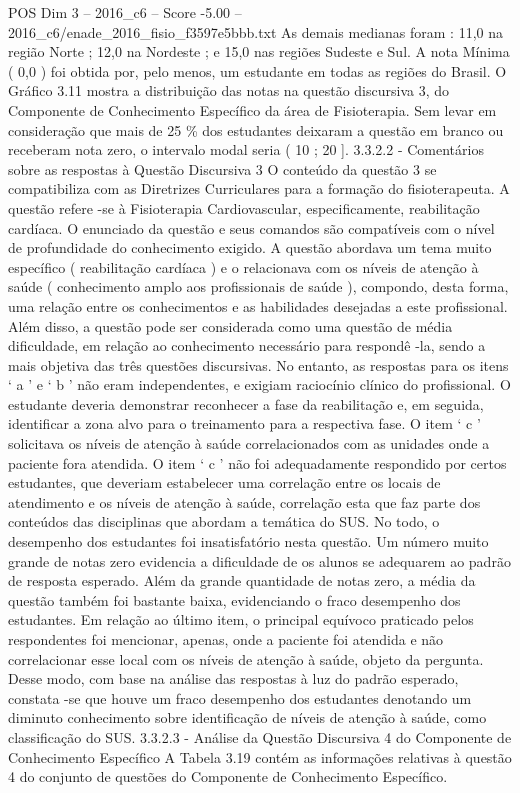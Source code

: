 \begin{textsample}{POS Dim 3 – 2016\_c6 – Score -5.00 – 2016\_c6/enade\_2016\_fisio\_f3597e5bbb.txt}
As demais medianas foram : 11,0 na região Norte ; 12,0 na Nordeste ; e 15,0 nas regiões Sudeste e Sul.
A nota Mínima ( 0,0 ) foi obtida por, pelo menos, um estudante em todas as regiões do Brasil.
O Gráfico 3.11 mostra a distribuição das notas na questão discursiva 3, do Componente de Conhecimento Específico da área de Fisioterapia.
Sem levar em consideração que mais de 25 \% dos estudantes deixaram a questão em branco ou receberam nota zero, o intervalo modal seria ( 10 ; 20 ]. 3.3.2.2 - Comentários sobre as respostas à Questão Discursiva 3 O conteúdo da questão 3 se compatibiliza com as Diretrizes Curriculares para a formação do fisioterapeuta.
A questão refere -se à Fisioterapia Cardiovascular, especificamente, reabilitação cardíaca.
O enunciado da questão e seus comandos são compatíveis com o nível de profundidade do conhecimento exigido.
A questão abordava um tema muito específico ( reabilitação cardíaca ) e o relacionava com os níveis de atenção à saúde ( conhecimento amplo aos profissionais de saúde ), compondo, desta forma, uma relação entre os conhecimentos e as habilidades desejadas a este profissional.
Além disso, a questão pode ser considerada como uma questão de média dificuldade, em relação ao conhecimento necessário para respondê -la, sendo a mais objetiva das três questões discursivas.
No entanto, as respostas para os itens ‘ a ’ e ‘ b ’ não eram independentes, e exigiam raciocínio clínico do profissional.
O estudante deveria demonstrar reconhecer a fase da reabilitação e, em seguida, identificar a zona alvo para o treinamento para a respectiva fase.
O item ‘ c ’ solicitava os níveis de atenção à saúde correlacionados com as unidades onde a paciente fora atendida.
O item ‘ c ’ não foi adequadamente respondido por certos estudantes, que deveriam estabelecer uma correlação entre os locais de atendimento e os níveis de atenção à saúde, correlação esta que faz parte dos conteúdos das disciplinas que abordam a temática do SUS.
No todo, o desempenho dos estudantes foi insatisfatório nesta questão.
Um número muito grande de notas zero evidencia a dificuldade de os alunos se adequarem ao padrão de resposta esperado.
Além da grande quantidade de notas zero, a média da questão também foi bastante baixa, evidenciando o fraco desempenho dos estudantes.
Em relação ao último item, o principal equívoco praticado pelos respondentes foi mencionar, apenas, onde a paciente foi atendida e não correlacionar esse local com os níveis de atenção à saúde, objeto da pergunta.
Desse modo, com base na análise das respostas à luz do padrão esperado, constata -se que houve um fraco desempenho dos estudantes denotando um diminuto conhecimento sobre identificação de níveis de atenção à saúde, como classificação do SUS. 3.3.2.3 - Análise da Questão Discursiva 4 do Componente de Conhecimento Específico A Tabela 3.19 contém as informações relativas à questão 4 do conjunto de questões do Componente de Conhecimento Específico.

\end{textsample}
